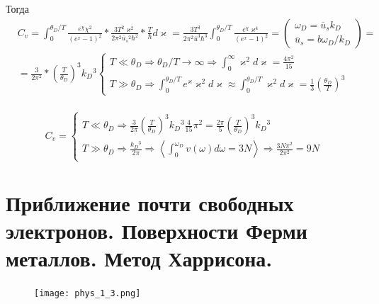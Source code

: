 Тогда 
\begin{equation}
    \begin{aligned} & \left.C_v=\int_0^{\theta_D / T} \frac{e^\chi \chi^2}{\left(e^x-1\right)^2} * \frac{3 T^2 \varkappa^2}{2 \pi^2 \overline{u}_s{ }^2 \hbar^2} * \frac{T}{\hbar} d \varkappa=\frac{3 T^3}{2 \pi^2 \overline{u}^3 \mathrm{\hbar}^3} \int_0^{\theta_D / T} \frac{e^\chi \varkappa^4}{\left(e^x-1\right)^2}=\left( \begin{array}{l} \omega_D=\overline{u}_s k_D \\ \overline{u}_s=b\omega_D / k_D  \end{array}\right. \right) = \\ & =\frac{3}{2 \pi^2} *\left(\frac{T}{\theta_D}\right)^3 k_D{ }^3\left\{\begin{array}{c}T \ll \theta_D \Rightarrow \theta_D / T \rightarrow \infty \Rightarrow \int_0^{\infty} \varkappa^2 d \varkappa=\frac{4 \pi^2}{15} \\ T \gg \theta_D \Rightarrow \int_0^{\theta_D / T} e^{\varkappa} \varkappa^2 d \varkappa \approx \int_0^{\theta_D / T} \varkappa^2 d \varkappa=\frac{1}{3}\left(\frac{\theta_D}{T}\right)^3\end{array}\right. \\ & \end{aligned}
    \end{equation}
    
\begin{equation}
    C_v=\left\{\begin{array}{c}T \ll \theta_D \Rightarrow \frac{3}{2 \pi}\left(\frac{T}{\theta_D}\right)^3 k_D{ }^3 \frac{4}{15} \pi^2=\frac{2 \pi}{5}\left(\frac{T}{\theta_D}\right)^3 k_D{ }^3 \\ T \gg \theta_D \Rightarrow \frac{k_D{ }^3}{2 \pi} \Rightarrow\left\langle\int_0^{\omega_D} v(\omega) d \omega=3 N\right\rangle \Rightarrow \frac{3 N \pi^2}{2 \pi^2}=9 N\end{array}\right. 
\end{equation}


\section{Приближение почти свободных электронов. Поверхности Ферми металлов. Метод Харрисона.}

\begin{figure}[h!]
    \centering
    \texttt{[image: phys\_1\_3.png]}
\end{figure}

